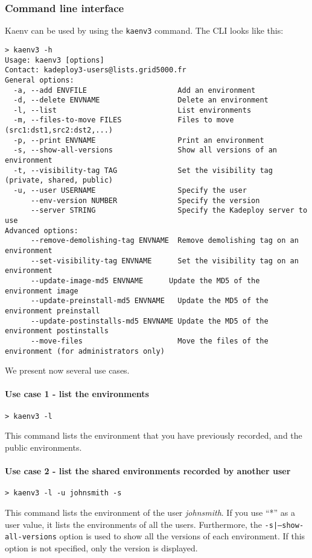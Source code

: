 \documentclass[a4wide,10pt,oneside]{book}
\begin{document}
\subsubsection{Command line interface}
Kaenv can be used by using the \texttt{kaenv3} command. The CLI looks like this:
\begin{small}
\begin{verbatim}
> kaenv3 -h
Usage: kaenv3 [options]
Contact: kadeploy3-users@lists.grid5000.fr
General options:
  -a, --add ENVFILE                     Add an environment
  -d, --delete ENVNAME                  Delete an environment
  -l, --list                            List environments
  -m, --files-to-move FILES             Files to move (src1:dst1,src2:dst2,...)
  -p, --print ENVNAME                   Print an environment
  -s, --show-all-versions               Show all versions of an environment
  -t, --visibility-tag TAG              Set the visibility tag (private, shared, public)
  -u, --user USERNAME                   Specify the user
      --env-version NUMBER              Specify the version
      --server STRING                   Specify the Kadeploy server to use
Advanced options:
      --remove-demolishing-tag ENVNAME  Remove demolishing tag on an environment
      --set-visibility-tag ENVNAME      Set the visibility tag on an environment
      --update-image-md5 ENVNAME      Update the MD5 of the environment image
      --update-preinstall-md5 ENVNAME   Update the MD5 of the environment preinstall
      --update-postinstalls-md5 ENVNAME Update the MD5 of the environment postinstalls
      --move-files                      Move the files of the environment (for administrators only)
\end{verbatim}
\end{small}

We present now several use cases.
\paragraph{Use case 1 - list the environments}
\begin{verbatim}
> kaenv3 -l
\end{verbatim}
This command lists the environment that you have previously recorded, and the public environments.

\paragraph{Use case 2 - list the shared environments recorded by another user}
\begin{verbatim}
> kaenv3 -l -u johnsmith -s
\end{verbatim}
This command lists the environment of the user \textit{johnsmith}. If you use ``*'' as a user value, it lists the environments of all the users. Furthermore, the \texttt{-s|--show-all-versions} option is used to show all the versions of each environment. If this option is not specified, only the version is displayed.
\end{document}
